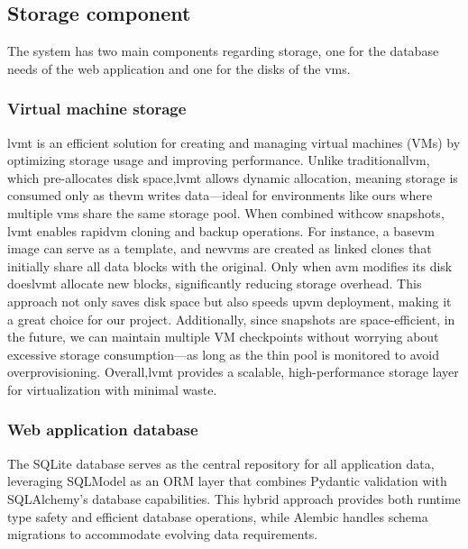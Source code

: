     \subsection{Storage component}
        
        The system has two main components regarding storage, one for the database needs of the web application and one for the disks of the \ac{vm}s.

        \subsubsection{Virtual machine storage}

            \ac{lvmt} is an efficient solution for creating and managing virtual machines (VMs) by optimizing storage usage and improving performance. Unlike 
            traditional\ac{lvm}, which pre-allocates disk space,\ac{lvmt} allows dynamic allocation, meaning storage is consumed only as the\ac{vm} writes 
            data—ideal for environments like ours where multiple \ac{vm}s share the same storage pool. When combined with\ac{cow} snapshots, \ac{lvmt} enables 
            rapid\ac{vm} cloning and backup operations. For instance, a base\ac{vm} image can serve as a template, and new\ac{vm}s are created as linked 
            clones that initially share all data blocks with the original. Only when a\ac{vm} modifies its disk does\ac{lvmt} allocate new blocks, 
            significantly reducing storage overhead. This approach not only saves disk space but also speeds up\ac{vm} deployment, making it a great choice for 
            our project. Additionally, since snapshots are space-efficient, in the future, we can maintain multiple VM checkpoints without worrying about excessive 
            storage consumption—as long as the thin pool is monitored to avoid overprovisioning. Overall,\ac{lvmt} provides a scalable, high-performance storage 
            layer for virtualization with minimal waste.

        \subsubsection{Web application database}

            The SQLite database serves as the central repository for all application data, leveraging SQLModel as an ORM layer that combines Pydantic 
            validation with SQLAlchemy's database capabilities. This hybrid approach provides both runtime type safety and efficient database operations, 
            while Alembic handles schema migrations to accommodate evolving data requirements.

